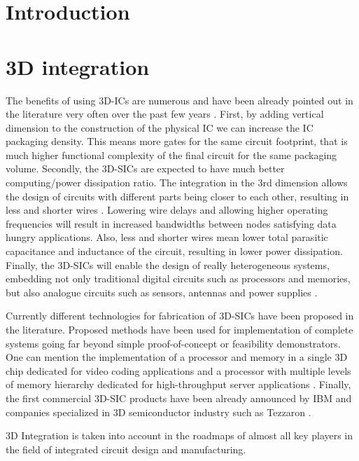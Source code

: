 \label{cha:rol.icdesign}

\section{Introduction}

\section{3D integration}

The benefits of using 3D-ICs are numerous and have been already pointed out in the literature very often over the past few years \cite{659500}. First, by adding vertical dimension to the construction of the physical IC we can increase the IC packaging density. This means more gates for the same circuit footprint, that is much higher functional complexity of the final circuit for the same packaging volume. Secondly, the 3D-SICs are expected to have much better computing/power dissipation ratio. The integration in the 3rd dimension allows the design of circuits with different parts being closer to each other, resulting in less and shorter wires \cite{981091}. Lowering wire delays and allowing higher operating frequencies will result in increased bandwidths between nodes satisfying data hungry applications. Also, less and shorter wires mean lower total parasitic capacitance and inductance of the circuit, resulting in lower power dissipation. Finally, the 3D-SICs will enable the design of really heterogeneous systems, embedding not only traditional digital circuits such as processors and memories, but also analogue circuits such as sensors, antennas and power supplies \cite{4299568}.

Currently different technologies for fabrication of 3D-SICs have been proposed in the literature. Proposed methods have been used for implementation of complete systems going far beyond simple proof-of-concept or feasibility demonstrators. One can mention the implementation of a processor and memory in a single 3D chip dedicated for video coding applications \cite{1696226} and a processor with multiple levels of memory hierarchy dedicated for high-throughput server applications \cite{1168873}. Finally, the first commercial 3D-SIC products have been already announced by IBM \cite{1167715} and companies specialized in 3D semiconductor industry such as Tezzaron \cite{terra04}.

3D Integration is taken into account in the roadmaps of almost all key players in the field of integrated circuit design and manufacturing.

